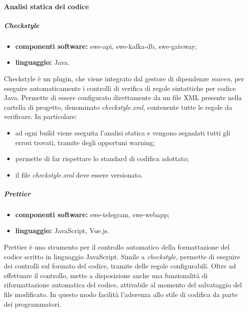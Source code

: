             \paragraph{Analisi statica del codice}

                \subparagraph{Checkstyle}

                \begin{itemize}
                    \item \textbf{componenti software:} swe-api, swe-kafka-db, swe-gateway;
                    \item \textbf{linguaggio:} Java.
                \end{itemize}
                
                Checkstyle è un plugin, che viene integrato dal gestore di dipendenze \textit{maven}, per eseguire automaticamente i controlli di verifica di regole sintattiche per codice Java. Permette di essere configurato direttamente da un file XML presente nella cartella di progetto, denominato \textit{checkstyle.xml}, contenente tutte le regole da verificare. In particolare:
                \begin{itemize}
                    \item ad ogni build viene eseguita l'analisi statica e vengono segnalati tutti gli errori trovati, tramite degli opportuni warning;
                    \item permette di far rispettare lo standard di codifica adottato;
                    \item il file \textit{checkstyle.xml} deve essere versionato.
                \end{itemize}

                \subparagraph{Prettier}

                \begin{itemize}
                    \item \textbf{componenti software:} swe-telegram, swe-webapp;
                    \item \textbf{linguaggio:} JavaScript, Vue.js.
                \end{itemize}
                
                Prettier è uno strumento per il controllo automatico della formattazione del codice scritto in linguaggio JavaScript. Simile a \textit{checkstyle}, permette di eseguire dei controlli sul formato del codice, tramite delle regole configurabili.
                Oltre ad effettuare il controllo, mette a disposizione anche una funzionalità di riformattazione automatica del codice, attivabile al momento del salvataggio del file modificato. In questo modo facilità l'aderenza allo stile di codifica da parte dei programmatori.
				
